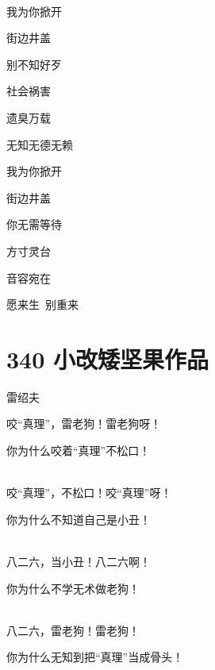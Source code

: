 \documentclass[UTF8,12pt,oneside]{ctexbook}
\def\pau#1{\begin{center} {#1} \end{center}} %
\def\poem#1#2{\section{#1}\pau{#2}} %
\begin{document}
\begin{center}
            ~\\
            我为你掀开
            
            街边井盖
            
            别不知好歹
            
            社会祸害
            
            遗臭万载
            
            无知无德无赖
            
            我为你掀开
            
            街边井盖
            
            你无需等待
            
            方寸灵台
            
            音容宛在
            
            愿来生\ 别重来
        \end{center}

        \poem{340 小改矮坚果作品}{雷绍夫}
        \begin{center}
            咬“真理”，雷老狗！雷老狗呀！

            你为什么咬着“真理”不松口！

            ~\\
            咬“真理”，不松口！咬“真理”呀！
            
            你为什么不知道自己是小丑！

            ~\\
            八二六，当小丑！八二六啊！
            
            你为什么不学无术做老狗！
            
            ~\\
            八二六，雷老狗！雷老狗！
            
            你为什么无知到把“真理”当成骨头！
        \end{center}
\end{document}

